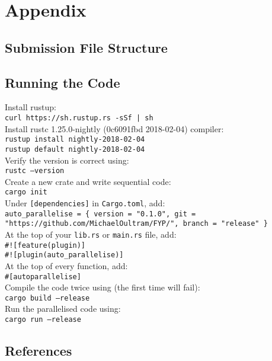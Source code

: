 \chapter{Appendix}
\section{Submission File Structure}

\section{Running the Code}
Install rustup: \\
\texttt{curl https://sh.rustup.rs -sSf | sh} \\

Install rustc 1.25.0-nightly (0c6091fbd 2018-02-04) compiler: \\
\texttt{rustup install nightly-2018-02-04} \\
\texttt{rustup default nightly-2018-02-04} \\

Verify the version is correct using: \\
\texttt{rustc --version} \\

Create a new crate and write sequential code: \\
\texttt{cargo init} \\

Under \texttt{[dependencies]} in \texttt{Cargo.toml}, add: \\
\texttt{auto\_parallelise = \{ version = "0.1.0", git = "https://github.com/MichaelOultram/FYP/", branch = "release" \}} \\

At the top of your \texttt{lib.rs} or \texttt{main.rs} file, add: \\
\texttt{\#![feature(plugin)]} \\
\texttt{\#![plugin(auto\_parallelise)]} \\

At the top of every function, add: \\
\texttt{\#[autoparallelise]} \\

Compile the code twice using (the first time will fail): \\
\texttt{cargo build --release} \\

Run the parallelised code using: \\
\texttt{cargo run --release}

\section{References}
\printbibliography[heading=none]



